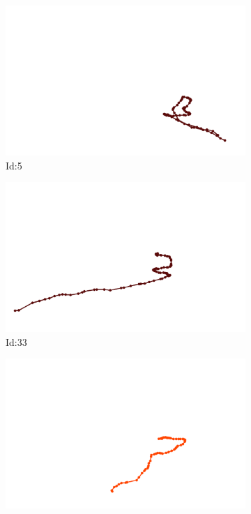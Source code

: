 \documentclass[12pt,twoside]{report}
\begin{document}
\begin{figure}
\centering
\begin{subfigure}[b]{0.20\textwidth}
\centering
\includegraphics[width=\textwidth]{../trajectories/5.png}
\caption{Id:5}
\end{subfigure}
\begin{subfigure}[b]{0.20\textwidth}
\centering
\includegraphics[width=\textwidth]{../trajectories/33.png}
\caption{Id:33}
\end{subfigure}
\begin{subfigure}[b]{0.20\textwidth}
\centering
\includegraphics[width=\textwidth]{../trajectories/55.png}

\end{subfigure}
\end{figure}
\end{document}
